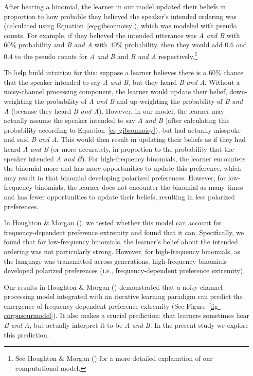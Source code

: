 \documentclass[
  12pt,
]{scrartcl}
\begin{document}
After hearing a binomial, the learner in our model updated their beliefs
in proportion to how probable they believed the speaker's intended
ordering was (calculated using Equation~\ref{eq-gibsonnoisy}), which was
modeled with pseudo counts. For example, if they believed the intended
utterance was \emph{A and B} with 60\% probability and \emph{B and A}
with 40\% probability, then they would add 0.6 and 0.4 to the pseudo
counts for \emph{A and B} and \emph{B and A} respectively.\footnote{See
  Houghton \& Morgan
  ()
  for a more detailed explanation of our computational model.}

To help build intuition for this: suppose a learner believes there is a
60\% chance that the speaker intended to say \emph{A and B}, but they
heard \emph{B and A}. Without a noisy-channel processing component, the
learner would update their belief, down-weighting the probability of
\emph{A and B} and up-weighting the probability of \emph{B and A}
(because they heard \emph{B and A}). However, in our model, the learner
may actually assume the speaker intended to say \emph{A and B} (after
calculating this probability according to
Equation~\ref{eq-gibsonnoisy}), but had actually misspoke and said
\emph{B and A}. This would then result in updating their beliefs as if
they had heard \emph{A and B} (or more accurately, in proportion to the
probability that the speaker intended \emph{A and B}). For
high-frequency binomials, the learner encounters the binomial more and
has more opportunities to update this preference, which may result in
that binomial developing polarized preferences. However, for
low-frequency binomials, the learner does not encounter the binomial as
many times and has fewer opportunities to update their beliefs,
resulting in less polarized preferences.

In Houghton \& Morgan
(),
we tested whether this model can account for frequency-dependent
preference extremity and found that it can. Specifically, we found that
for low-frequency binomials, the learner's belief about the intended
ordering was not particularly strong. However, for high-frequency
binomials, as the language was transmitted across generations,
high-frequency binomials developed polarized preferences (i.e.,
frequency-dependent preference extremity).

Our results in Houghton \& Morgan
()
demonstrated that a noisy-channel processing model integrated with an
iterative learning paradigm can predict the emergence of
frequency-dependent preference extremity (See
Figure~\ref{fig-corpusourmodel}). It also makes a crucial prediction:
that learners sometimes hear \emph{B and A}, but actually interpret it
to be \emph{A and B}. In the present study we explore this prediction.
\end{document}
